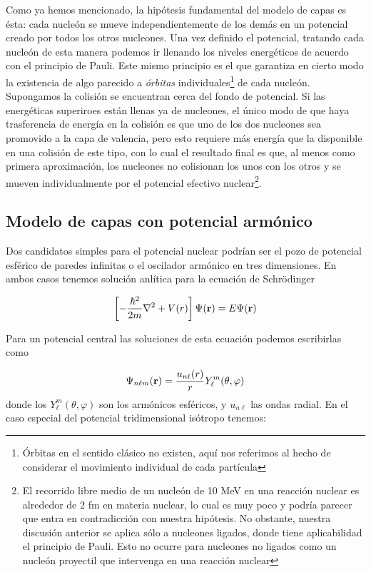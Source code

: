 Como ya hemos mencionado, la hipótesis fundamental del modelo de capas es ésta: cada nucleón se mueve independientemente de los demás en un potencial creado por todos los otros nucleones. Una vez definido el potencial, tratando cada nucleón de esta manera podemos ir llenando los niveles energéticos de acuerdo con el principio de Pauli. Este mismo principio es el que garantiza en cierto modo la existencia de algo parecido a \textit{órbitas} individuales\footnote{Órbitas en el sentido clásico no existen, aquí nos referimos al hecho de considerar el movimiento individual de cada partícula} de cada nucleón. Supongamos la colisión se encuentran cerca del fondo de potencial. Si las energéticas superiroes están llenas ya de nucleones, el único modo de que haya trasferencia de energía en la colisión es que uno de los dos nucleones sea promovido a la capa de valencia, pero esto requiere más energía que la disponible en una colisión de este tipo, con lo cual el resultado final es que, al menos como primera aproximación, los nucleones no colisionan los unos con los otros y se mueven individualmente por el potencial efectivo nuclear\footnote{El recorrido libre medio de un nucleón de 10 MeV en una reacción nuclear es alrededor de 2 fm en materia nuclear, lo cual es muy poco y podría parecer que entra en contradicción con nuestra hipótesis. No obstante, nuestra discusión anterior se aplica sólo a nucleones ligados, donde tiene aplicabilidad el principio de Pauli. Esto no ocurre para nucleones no ligados como un nucleón proyectil que intervenga en una reacción nuclear}.

\subsection{Modelo de capas con potencial armónico}

Dos candidatos simples para el potencial nuclear podrían ser el pozo de potencial esférico de paredes infinitas o el oscilador armónico en tres dimensiones. En ambos casos tenemos solución anlítica para la ecuación de Schrödinger

\begin{eqnarray}
	\left[ -\frac{\hbar^2}{2m} \nabla^2 + V(r) \right] \Psi (\mathbf{r}) = E\Psi (\mathbf{r})
\end{eqnarray}

Para un potencial central las soluciones de esta ecuación podemos escribirlas como

\begin{eqnarray}
	\Psi_{n\ell m} (\mathbf{r}) = \frac{u_{n \ell} (r)}{r} Y_{\ell}^m (\theta,\varphi)
\end{eqnarray}
donde los $Y_{\ell}^m (\theta,\varphi)$ son los armónicos esféricos, y $u_{n\ell}$ las ondas radial. En el caso especial del potencial tridimensional isótropo tenemos:

